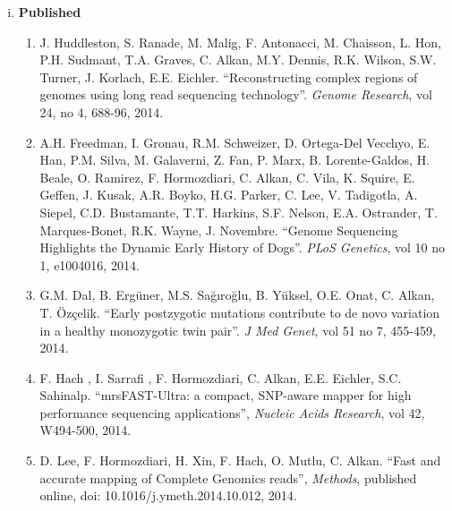 % 

\begin{enumerate}[i)]
\item {\bf Published} %

\begin{enumerate}

\item J. Huddleston, S. Ranade, M. Malig, F. Antonacci, M. Chaisson, L. Hon, P.H. Sudmant, T.A. Graves, C. Alkan, M.Y. Dennis, R.K. Wilson, S.W. Turner, J. Korlach, E.E. Eichler. ``Reconstructing complex regions of genomes using long read sequencing technology''. {\em Genome Research}, vol 24, no 4, 688-96, 2014.

\item A.H. Freedman, I. Gronau, R.M. Schweizer, D. Ortega-Del Vecchyo, E. Han, P.M. Silva, M. Galaverni, Z. Fan, P. Marx, B. Lorente-Galdos, H. Beale, O. Ramirez, F. Hormozdiari, C. Alkan, C. Vila, K. Squire, E. Geffen, J. Kusak, A.R. Boyko, H.G. Parker, C. Lee, V. Tadigotla, A. Siepel, C.D. Bustamante, T.T. Harkins, S.F. Nelson, E.A. Ostrander, T. Marques-Bonet, R.K. Wayne, J. Novembre. ``Genome Sequencing Highlights the Dynamic Early History of Dogs''. {\em PLoS Genetics}, vol 10 no 1, e1004016, 2014.

\item G.M. Dal, B. Ergüner, M.S. Sağıroğlu, B. Yüksel, O.E. Onat, C. Alkan, T. Özçelik. ``Early postzygotic mutations contribute to de novo variation in a healthy monozygotic twin pair''. {\em J Med Genet}, vol 51 no 7, 455-459, 2014.

\item F. Hach , I. Sarrafi , F. Hormozdiari, C. Alkan, E.E. Eichler, S.C. Sahinalp. ``mrsFAST-Ultra: a compact, SNP-aware mapper for high performance sequencing applications'', {\em Nucleic Acids Research}, vol 42, W494-500, 2014.
  
\item D. Lee, F. Hormozdiari, H. Xin, F. Hach, O. Mutlu, C. Alkan. ``Fast and accurate mapping of Complete Genomics reads'', {\em Methods}, published online, doi: 10.1016/j.ymeth.2014.10.012, 2014.
  

\end{enumerate}
\end{enumerate}
